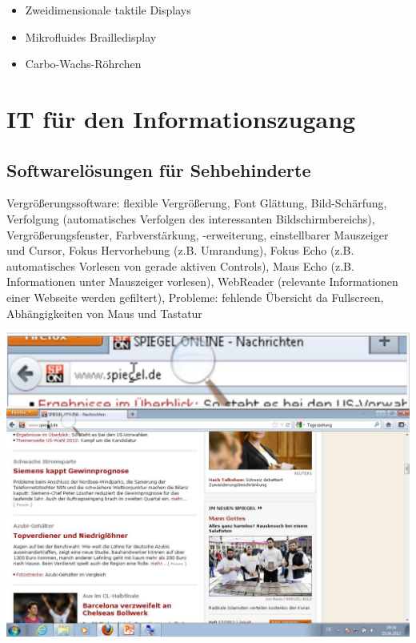 \documentclass[paper=a4, fontsize=11pt]{scrartcl} %
\numberwithin{equation}{section} %
\numberwithin{figure}{section} %
\numberwithin{table}{section} %
\begin{document}
\begin{itemize}
\item Zweidimensionale taktile Displays
\item Mikrofluides Brailledisplay
\item Carbo-Wachs-Röhrchen
\end{itemize}

\section{IT für den Informationszugang}

\subsection{Softwarelösungen für Sehbehinderte}

\begin{itemize}
\begin{minipage}[c]{0.55\textwidth}
\item Vergrößerungssoftware: flexible Vergrößerung, Font Glättung, Bild-Schärfung, Verfolgung (automatisches Verfolgen des interessanten Bildschirmbereichs), Vergrößerungsfenster, Farbverstärkung, -erweiterung, einstellbarer Mauszeiger und Cursor, Fokus Hervorhebung (z.B. Umrandung), Fokus Echo (z.B. automatisches Vorlesen von gerade aktiven Controls), Maus Echo (z.B. Informationen unter Mauszeiger vorlesen), WebReader (relevante Informationen einer Webseite werden gefiltert), Probleme: fehlende Übersicht da Fullscreen, Abhängigkeiten von Maus und Tastatur
\end{minipage}
\begin{minipage}[c]{0.35\textwidth}
\includegraphics[width=\textwidth]{imgs/softwarelupe}

\end{minipage}
\end{itemize}
\end{document}
